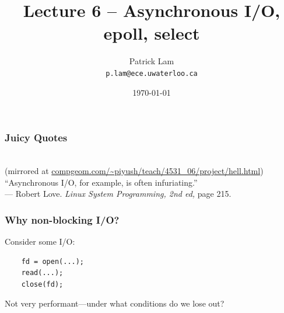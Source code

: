

\title{Lecture 6 -- Asynchronous I/O, epoll, select }

\author{Patrick Lam \\ \small \texttt{p.lam@ece.uwaterloo.ca}}
\date{\today}




\begin{frame}
  \titlepage

 \end{frame}

\begin{frame}
  \frametitle{Juicy Quotes}


  \\
{\scriptsize (mirrored at \url{compgeom.com/~piyush/teach/4531_06/project/hell.html})}
   \\[3em]

   ``Asynchronous I/O, for example, is often infuriating.''\\
--- Robert Love. {\em Linux System Programming, 2nd ed, } page 215.
  

\end{frame}

\begin{frame}[fragile]
  \frametitle{Why non-blocking I/O?}
  
  Consider some I/O:


\begin{minipage}{.5\textwidth}
\begin{lstlisting}
    fd = open(...);
    read(...);
    close(fd);
  \end{lstlisting}
\end{minipage}


  Not very performant---under what conditions do we lose out?

\end{frame}

